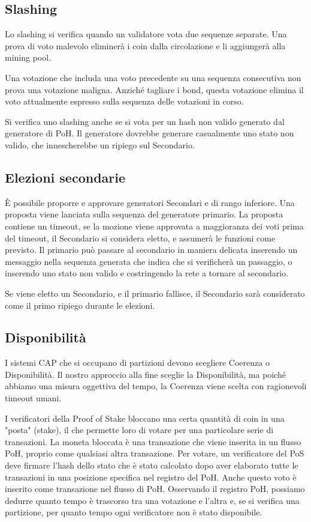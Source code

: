 \documentclass[12pt]{article}
\begin{document}
\subsection{Slashing}
Lo slashing si verifica quando un validatore vota due sequenze separate. Una prova di voto malevolo eliminerà i coin dalla circolazione e li aggiungerà alla mining pool.

Una votazione che includa una voto precedente su una sequenza consecutiva non prova una votazione maligna. Anziché tagliare i bond, questa votazione elimina il voto attualmente espresso sulla sequenza delle votazioni in corso.

Si verifica uno slashing anche se si vota per un hash non valido generato dal generatore di PoH. Il generatore dovrebbe generare casualmente uno stato non valido, che innescherebbe un ripiego sul Secondario.
\subsection{Elezioni secondarie}
È possibile proporre e approvare generatori Secondari e di rango inferiore. Una proposta viene lanciata sulla sequenza del generatore primario. La proposta contiene un timeout, se la mozione viene approvata a maggioranza dei voti prima del timeout, il Secondario si considera eletto, e assumerà le funzioni come previsto. Il primario può passare al secondario in maniera delicata inserendo un messaggio nella sequenza generata che indica che si verificherà un passaggio, o inserendo uno stato non valido e costringendo la rete a tornare al secondario.

Se viene eletto un Secondario, e il primario fallisce, il Secondario sarà considerato come il primo ripiego durante le elezioni.


\subsection{Disponibilità}\label{availability}
I sistemi CAP che si occupano di partizioni devono scegliere Coerenza o Disponibilità. Il nostro approccio alla fine sceglie la Disponibilità, ma poiché abbiamo una misura oggettiva del tempo, la Coerenza viene scelta con ragionevoli timeout umani.

I verificatori della Proof of Stake bloccano una certa quantità di coin in una "posta" (stake), il che permette loro di votare per una particolare serie di transazioni. La moneta bloccata è una transazione che viene inserita in un flusso PoH, proprio come qualsiasi altra transazione. Per votare, un verificatore del PoS deve firmare l'hash dello stato che è stato calcolato dopo aver elaborato tutte le transazioni in una posizione specifica nel registro del PoH. Anche questo voto è inserito come transazione nel flusso di PoH. Osservando il registro PoH, possiamo dedurre quanto tempo è trascorso tra una votazione e l'altra e, se si verifica una partizione, per quanto tempo ogni verificatore non è stato disponibile.
\end{document}
